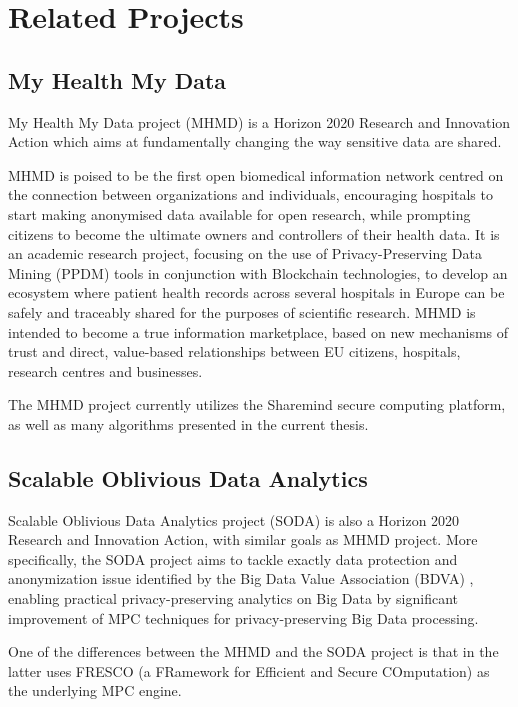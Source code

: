 \chapter{Related Projects}\label{c:related-work}

\section{My Health My Data}\label{s:mhmd}
My Health My Data project (MHMD) \cite{mhmd} is a Horizon 2020 Research and Innovation Action which aims at fundamentally changing the way sensitive data are shared.

MHMD is poised to be the first open biomedical information network centred on the connection between organizations and individuals, encouraging hospitals to start making anonymised data available for open research, while prompting citizens to become the ultimate owners and controllers of their health data.
It is an academic research project, focusing on the use of Privacy\hyp Preserving Data Mining (PPDM) tools in conjunction with Blockchain technologies, to develop an ecosystem where patient health records across several hospitals in Europe can be safely and traceably shared for the purposes of scientific research.
MHMD is intended to become a true information marketplace, based on new mechanisms of trust and direct, value-based relationships between EU citizens, hospitals, research centres and businesses.

The MHMD project currently utilizes the Sharemind secure computing platform, as well as many algorithms presented in the current thesis.



\section{Scalable Oblivious Data Analytics}\label{s:soda}
Scalable Oblivious Data Analytics project (SODA) \cite{soda} is also a Horizon 2020 Research and Innovation Action, with similar goals as MHMD project.
More specifically, the SODA project aims to tackle exactly data protection and anonymization issue identified by the Big Data Value Association (BDVA) \cite{bdva}, enabling practical privacy\hyp preserving analytics on Big Data by significant improvement of MPC techniques for privacy\hyp preserving Big Data processing.

One of the differences between the MHMD and the SODA project is that in the  latter uses FRESCO (a FRamework for Efficient and Secure COmputation) \cite{chan2017privacy, alxd1} as the underlying MPC engine.

